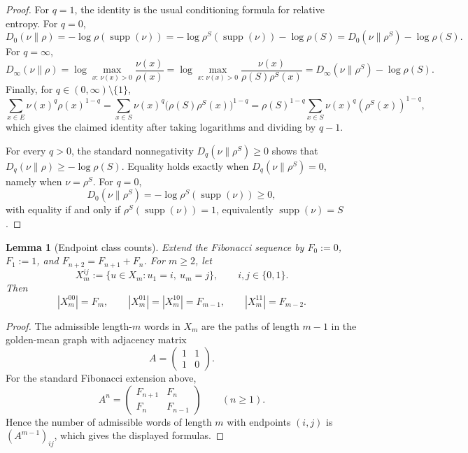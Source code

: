 \documentclass[11pt,letterpaper]{article}
\numberwithin{equation}{section}
\theoremstyle{plain}
\newtheorem{lemma}[theorem]{Lemma}
\theoremstyle{definition}
\theoremstyle{remark}
\DeclareMathOperator{\supp}{supp}
\begin{document}
\begin{proof}
For \(q=1\), the identity is the usual conditioning formula for relative
entropy. For \(q=0\),
\[
D_0(\nu\|\rho)
=
-\log \rho(\supp(\nu))
=
-\log \rho^S(\supp(\nu))-\log \rho(S)
=
D_0(\nu\|\rho^S)-\log \rho(S).
\]
For \(q=\infty\),
\[
D_\infty(\nu\|\rho)
=
\log\max_{x:\,\nu(x)>0}\frac{\nu(x)}{\rho(x)}
=
\log\max_{x:\,\nu(x)>0}\frac{\nu(x)}{\rho(S)\rho^S(x)}
=
D_\infty(\nu\|\rho^S)-\log \rho(S).
\]
Finally, for \(q\in(0,\infty)\setminus\{1\}\),
\[
\sum_{x\in E}\nu(x)^q\rho(x)^{1-q}
=
\sum_{x\in S}\nu(x)^q\bigl(\rho(S)\rho^S(x)\bigr)^{1-q}
=
\rho(S)^{1-q}\sum_{x\in S}\nu(x)^q(\rho^S(x))^{1-q},
\]
which gives the claimed identity after taking logarithms and dividing by
\(q-1\).

For every \(q>0\), the standard nonnegativity \(D_q(\nu\|\rho^S)\ge 0\) shows
that \(D_q(\nu\|\rho)\ge -\log\rho(S)\). Equality holds exactly when
\(D_q(\nu\|\rho^S)=0\), namely when \(\nu=\rho^S\). For \(q=0\),
\[
D_0(\nu\|\rho^S)=-\log \rho^S(\supp(\nu))\ge 0,
\]
with equality if and only if \(\rho^S(\supp(\nu))=1\), equivalently
\(\supp(\nu)=S\).
\end{proof}

\begin{lemma}[Endpoint class counts]\label{lem:endpoint-class-counts}
Extend the Fibonacci sequence by \(F_0:=0\), \(F_1:=1\), and
\(F_{n+2}=F_{n+1}+F_n\). For \(m\ge 2\), let
\[
X_m^{ij}:=\{u\in X_m:u_1=i,\ u_m=j\},
\qquad i,j\in\{0,1\}.
\]
Then
\[
|X_m^{00}|=F_m,\qquad
|X_m^{01}|=|X_m^{10}|=F_{m-1},\qquad
|X_m^{11}|=F_{m-2}.
\]
\end{lemma}

\begin{proof}
The admissible length-\(m\) words in \(X_m\) are the paths of length \(m-1\) in
the golden-mean graph with adjacency matrix
\[
A=\begin{pmatrix}1&1\\1&0\end{pmatrix}.
\]
For the standard Fibonacci extension above,
\[
A^n=
\begin{pmatrix}
F_{n+1} & F_n\\
F_n & F_{n-1}
\end{pmatrix}
\qquad (n\ge 1).
\]
Hence the number of admissible words of length \(m\) with endpoints \((i,j)\) is
\((A^{m-1})_{ij}\), which gives the displayed formulas.
\end{proof}
\end{document}
